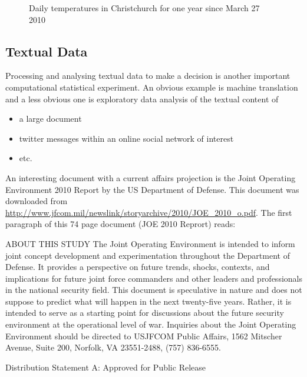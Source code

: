 \begin{figure}[htpb]
\caption{Daily temperatures in Christchurch for one year since March 27 2010 \label{F:ChchTemps365DaysSince20100327}}
\centering   {}
\end{figure}

\subsection{Textual Data}

Processing and analysing textual data to make a decision is another important computational statistical experiment. An obvious example  is machine translation and a less obvious one is exploratory data analysis of the textual content of
\begin{itemize}
\item a large document
\item twitter messages within an online social network of interest
\item etc.
\end{itemize}

An interesting document with a current affairs projection is the Joint Operating Environment 2010 Report by the US Department of Defense.  This document was downloaded from \href{http://www.jfcom.mil/newslink/storyarchive/2010/JOE_2010_o.pdf}{\url{http://www.jfcom.mil/newslink/storyarchive/2010/JOE_2010_o.pdf}}.  The first paragraph of this 74 page document (JOE 2010 Reprort) reads:

{\small
ABOUT THIS STUDY The Joint Operating Environment is intended to inform joint concept development and experimentation throughout the Department of Defense. It provides a perspective on future trends, shocks, contexts, and implications for future joint force commanders and other leaders and professionals in the national security field. This document is speculative in nature and does not suppose to predict what will happen in the next twenty-five years. Rather, it is intended to serve as a starting point for discussions about the future security environment at the operational level of war. Inquiries about the Joint Operating Environment should be directed to USJFCOM Public Affairs, 1562 Mitscher Avenue, Suite 200, Norfolk, VA 23551-2488, (757) 836-6555.

Distribution Statement A: Approved for Public Release
}

